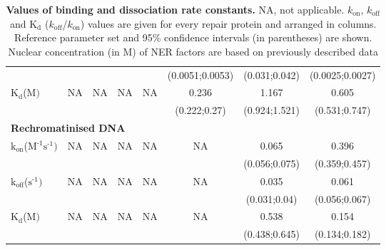 \begin{table}[H]
\begin{tabular}{lccccccc}
		&                               &                              &                           &                          &(0.0051;0.0053)     &  (0.031;0.042)  & (0.0025;0.0027)  \\
		$\text{K}_{\text{d}}$({\textmu}$\text{M})$                                                  & NA                          &NA                         & NA                      &NA                      &0.236                   &1.167                    &0.605     \\
		&                               &                              &                           &                          &(0.222;0.27)     &  (0.924;1.521)  & (0.531;0.747)  \\
		\multicolumn{8}{l}{\textbf{Rechromatinised DNA}} \\
		$\text{k}_{\text{on}}$({\textmu}$\text{M}^{\text{-1}}\text{s}^{\text{-1}})$    & NA                          & NA                        & NA                      &  NA                    & NA                       &0.065                    &0.396    \\
		&                               &                             &                            &                          &                            &(0.056;0.075)    & (0.359;0.457)    \\
		$\text{k}_{\text{off}}$($\text{s}^{\text{-1}})$                                             & NA                          &NA                          & NA                      & NA                     & NA                       & 0.035                   &0.061     \\
		&                               &                              &                           &                          &                            &  (0.031;0.04)  & (0.056;0.067)  \\
		$\text{K}_{\text{d}}$({\textmu}$\text{M})$                                                  & NA                          &NA                         & NA                      &NA                      &NA                         &0.538                    &0.154     \\
		&                               &                              &                           &                          &                            &  (0.438;0.645)  & (0.134;0.182)  \\
		\hline
	\end{tabular}
	\caption{\textbf{Values of binding and dissociation rate constants.} NA, not applicable. $k_{\text{on}}$, $k_{\text{off}}$ and $\text{K}_{\text{d}}$ ($k_{\text{off}}$/$k_{\text{on}}$) values are given for every repair protein and arranged in columns. Reference parameter set and 95\% confidence intervals (in parentheses) are shown. Nuclear concentration (in \textmu M) of NER factors are based on previously described data \cite{Luijsterburg2010}}
	\label{tab:parameter_bigTable}
\end{table}

